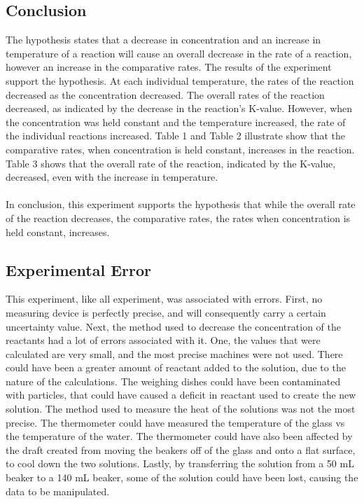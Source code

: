\documentclass{article}
\begin{document}
\subsection*{Conclusion}
The hypothesis states that a decrease in concentration and an increase in temperature of a reaction will cause an overall decrease in the rate of a reaction, however an increase in the comparative rates. The results of the experiment support the hypothesis. At each individual temperature, the rates of the reaction decreased as the concentration decreased. The overall rates of the reaction decreased, as indicated by the decrease in the reaction's K-value. However, when the concentration was held constant and the temperature increased, the rate of the individual reactions increased. Table 1 and Table 2 illustrate show that the comparative rates, when concentration is held constant, increases in the reaction. Table 3 shows that the overall rate of the reaction, indicated by the K-value, decreased, even with the increase in temperature. \\\\
In conclusion, this experiment supports the hypothesis that while the overall rate of the reaction decreases, the comparative rates, the rates when concentration is held constant, increases. 
\subsection*{Experimental Error} %
This experiment, like all experiment, was associated with errors. First, no measuring device is perfectly precise, and will consequently carry a certain uncertainty value. Next, the method used to decrease the concentration of the reactants had a lot of errors associated with it. One, the values that were calculated are very small, and the most precise machines were not used. There could have been a greater amount of reactant added to the solution, due to the nature of the calculations. The weighing dishes could have been contaminated with particles, that could have caused a deficit in reactant used to create the new solution. The method used to measure the heat of the solutions was not the most precise. The thermometer could have measured the temperature of the glass vs the temperature of the water. The thermometer could have also been affected by the draft created from moving the beakers off of the glass and onto a flat surface, to cool down the two solutions. Lastly, by transferring the solution from a 50 mL beaker to a 140 mL beaker, some of the solution could have been lost, causing the data to be manipulated. 
\end{document}
